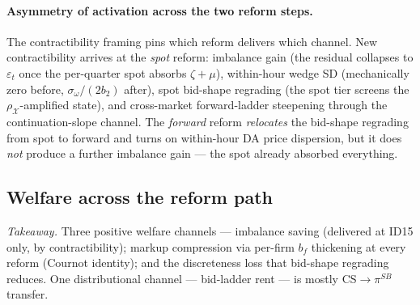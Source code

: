 \documentclass[11pt,a4paper]{article}
\theoremstyle{definition}
\theoremstyle{remark}
\theoremstyle{plain}
\begin{document}
\paragraph{Asymmetry of activation across the two reform steps.} The contractibility framing pins which reform delivers which channel. New contractibility arrives at the \emph{spot} reform: imbalance gain (the residual collapses to $\varepsilon_t$ once the per-quarter spot absorbs $\zeta + \mu$), within-hour wedge SD (mechanically zero before, $\sigma_\omega/(2b_2)$ after), spot bid-shape regrading (the spot tier screens the $\rho_{\mathcal X}$-amplified state), and cross-market forward-ladder steepening through the continuation-slope channel. The \emph{forward} reform \emph{relocates} the bid-shape regrading from spot to forward and turns on within-hour DA price dispersion, but it does \emph{not} produce a further imbalance gain --- the spot already absorbed everything.

\subsection{Welfare across the reform path}\label{sec:welfare}

\emph{Takeaway.} Three positive welfare channels --- imbalance saving (delivered at ID15 only, by contractibility); markup compression via per-firm $b_f$ thickening at every reform (Cournot identity); and the discreteness loss that bid-shape regrading reduces. One distributional channel --- bid-ladder rent --- is mostly CS$\to\pi^{SB}$ transfer.
\end{document}
